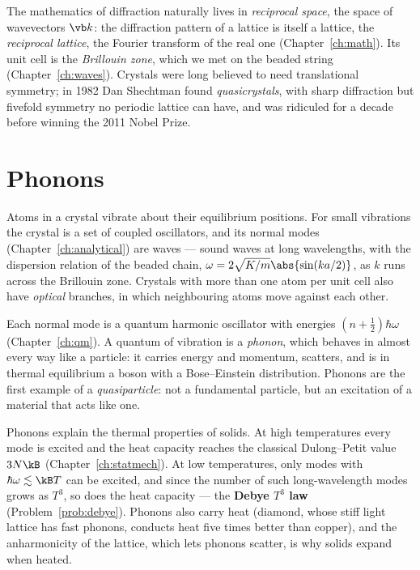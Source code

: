 The mathematics of diffraction naturally lives in \emph{reciprocal space}, the space of wavevectors $\vb k$: the diffraction pattern of a lattice is itself a lattice, the \emph{reciprocal lattice}, the Fourier transform of the real one (Chapter~\ref{ch:math}). Its unit cell is the \emph{Brillouin zone}, which we met on the beaded string (Chapter~\ref{ch:waves}). Crystals were long believed to need translational symmetry; in 1982 Dan Shechtman found \emph{quasicrystals}, with sharp diffraction but fivefold symmetry no periodic lattice can have, and was ridiculed for a decade before winning the 2011 Nobel Prize.

\section{Phonons}

Atoms in a crystal vibrate about their equilibrium positions. For small vibrations the crystal is a set of coupled oscillators, and its normal modes (Chapter~\ref{ch:analytical}) are waves --- sound waves at long wavelengths, with the dispersion relation of the beaded chain, $\omega = 2\sqrt{K/m}\abs{\sin(ka/2)}$, as $k$ runs across the Brillouin zone. Crystals with more than one atom per unit cell also have \emph{optical} branches, in which neighbouring atoms move against each other.

Each normal mode is a quantum harmonic oscillator with energies $(n+\tfrac12)\hbar\omega$ (Chapter~\ref{ch:qm}). A quantum of vibration is a \emph{phonon}, which behaves in almost every way like a particle: it carries energy and momentum, scatters, and is in thermal equilibrium a boson with a Bose--Einstein distribution. Phonons are the first example of a \emph{quasiparticle}: not a fundamental particle, but an excitation of a material that acts like one.

Phonons explain the thermal properties of solids. At high temperatures every mode is excited and the heat capacity reaches the classical Dulong--Petit value $3N\kB$ (Chapter~\ref{ch:statmech}). At low temperatures, only modes with $\hbar\omega\lesssim\kB T$ can be excited, and since the number of such long-wavelength modes grows as $T^3$, so does the heat capacity --- the \textbf{Debye $T^3$ law} (Problem~\ref{prob:debye}). Phonons also carry heat (diamond, whose stiff light lattice has fast phonons, conducts heat five times better than copper), and the anharmonicity of the lattice, which lets phonons scatter, is why solids expand when heated.

